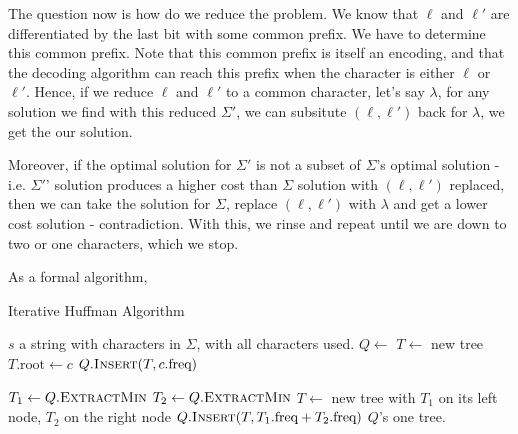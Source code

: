 The question now is how do we reduce the problem. We know that $\ell$ and $\ell'$ are differentiated by the last bit with some common prefix. 
We have to determine this common prefix. 
Note that this common prefix is itself an encoding, and that the decoding algorithm can reach this prefix when the character is either $\ell$ or $\ell'$. 
Hence, if we reduce $\ell$ and $\ell'$ to a common character, let's say $\lambda$, for any solution we find with this reduced $\Sigma'$, we can subsitute $(\ell, \ell')$ back for $\lambda$, we get the our solution.

Moreover, if the optimal solution for $\Sigma'$ is not a subset of $\Sigma$'s optimal solution - i.e. $\Sigma'$' solution produces a higher cost than $\Sigma$ solution with $(\ell, \ell')$ replaced, then we can take the solution for $\Sigma$, replace $(\ell, \ell')$ with $\lambda$ and get a lower cost solution - contradiction. With this, we rinse and repeat until we are down to two or one characters, which we stop. 

As a formal algorithm, 

\begin{algorithm}[H]
\caption{Iterative Huffman Algorithm}

\begin{algorithmic}[1]
    \Require $s$ a string with characters in $\Sigma$, with all characters used. 
        \State $Q \gets$ 
            \State $T \gets$ new tree
            \State $T.\text{root} \gets c$
            \State $Q.\Call{Insert}{T,c.\text{freq}}$
        \EndFor

            \State $T_1 \gets Q.\Call{ExtractMin}{}$ 
            \State $T_2 \gets Q.\Call{ExtractMin}{}$ 
            \State $T \gets$ new tree with $T_1$ on its left node, $T_2$ on the right node 
            \State $Q.\Call{Insert}{T,T_1.\text{freq}+T_2.\text{freq}}$ 
        \EndWhile
        \State \Return $Q$'s one tree. 
    \EndFunction
\end{algorithmic}
\end{algorithm}